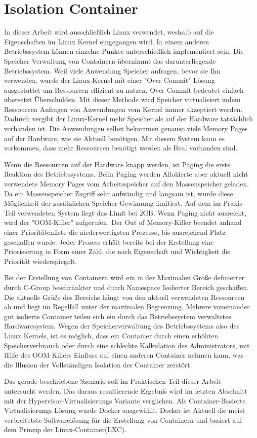 \thispagestyle{empty}
\section{Isolation Container}

In dieser Arbeit wird ausschließlich Linux verwendet, weshalb auf die Eigenschaften im Linux Kernel eingegangen wird. In einem anderen Betriebssystem können einzelne Punkte unterschiedlich implementiert sein. Die Speicher Verwaltung von Containern übernimmt das darunterliegende Betriebssystem. Weil viele Anwendung Speicher anfragen, bevor sie Ihn verwenden, wurde der Linux-Kernel mit einer "Over Commit" Lösung ausgestattet um Ressourcen effizient zu nutzen. Over Commit bedeutet einfach übersetzt Überschulden. Mit dieser Methode wird Speicher virtualisiert indem Ressourcen Anfragen von Anwendungen vom Kernel immer akzeptiert werden. Dadurch vergibt der Linux-Kernel mehr Speicher als auf der Hardware tatsächlich vorhanden ist. Die Anwendungen selbst bekommen genauso viele Memory Pages auf der Hardware, wie sie Aktuell benötigen. Mit diesem System kann es vorkommen, dass mehr Ressourcen benötigt werden als Real vorhanden sind. 

Wenn die Ressourcen auf der Hardware knapp werden, ist Paging die erste Reaktion des Betriebssystems. Beim Paging werden Allokierte aber aktuell nicht verwendete Memory Pages vom Arbeitsspeicher auf den Massenspeicher geladen. Da ein Massenspeicher Zugriff sehr aufwändig und langsam ist, wurde diese Möglichkeit der zusätzlichen Speicher Gewinnung limitiert. Auf dem im Praxis Teil verwendeten System liegt das Limit bei 2GB. Wenn Paging nicht ausreicht, wird der "OOM-Killer" aufgerufen. Der Out of Memory-Killer beendet anhand einer Prioritätenliste die niederwertigsten Prozesse, bis ausreichend Platz geschaffen wurde. Jeder Prozess erhält bereits bei der Erstellung eine Priorisierung in Form einer Zahl, die nach Eigenschaft und Wichtigkeit die Priorität wiederspiegelt.

Bei der Erstellung von Containern wird ein in der Maximalen Größe definierter durch C-Group beschränkter und durch Namespace Isolierter Bereich geschaffen. Die aktuelle Größe des Bereichs hängt von den aktuell verwendeten Ressourcen ab und liegt im Regelfall unter der maximalen Begrenzung. Mehrere voneinander gut isolierte Container teilen sich ein durch das Betriebssystem verwaltetes Hardwaresystem. Wegen der Speicherverwaltung des Betriebssystems also des Linux Kernels, ist es möglich, dass ein Container durch einen erhöhten Speicherverbrauch oder durch eine schlechte Kalkulation des Administrators, mit Hilfe des OOM-Killers Einfluss auf einen anderen Container nehmen kann, was die Illusion der Vollständigen Isolation der Container zerstört. 

Das gerade beschriebene Szenario soll im Praktischen Teil dieser Arbeit untersucht werden. Das daraus resultierende Ergebnis wird im letzten Abschnitt mit der Hypervisor-Virtualisierungs Variante verglichen. Als Container-Basierte Virtualisierungs Lösung wurde Docker ausgewählt. Docker ist Aktuell die meist verbreitetste Softwarelösung für die Erstellung von Containern und basiert auf dem Prinzip der Linux-Container(LXC).





